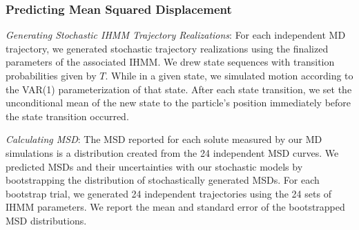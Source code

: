 \documentclass[journal=jpcbfk,manuscript=article]{achemso}
\begin{document}
  
  \subsubsection*{Predicting Mean Squared Displacement}\label{method:realizations}
  
  \textit{Generating Stochastic IHMM Trajectory Realizations}: For each independent 
  MD trajectory, we generated stochastic trajectory realizations using the finalized 
  parameters of the associated IHMM. We drew state sequences with transition probabilities
  given by $T$. While in a given state, we simulated motion according to the VAR(1) 
  parameterization of that state. After each state transition, we set the unconditional
  mean of the new state to the particle's position immediately before the state 
  transition occurred.
  
  \textit{Calculating MSD}: The MSD reported for each solute measured by our MD 
  simulations is a distribution created from the 24 independent MSD curves. We predicted 
  MSDs and their uncertainties with our stochastic models by bootstrapping the 
  distribution of stochastically generated MSDs. For each bootstrap trial, we generated
  24 independent trajectories using the 24 sets of IHMM parameters. We report the mean
  and standard error of the bootstrapped MSD distributions.
  
\end{document}
